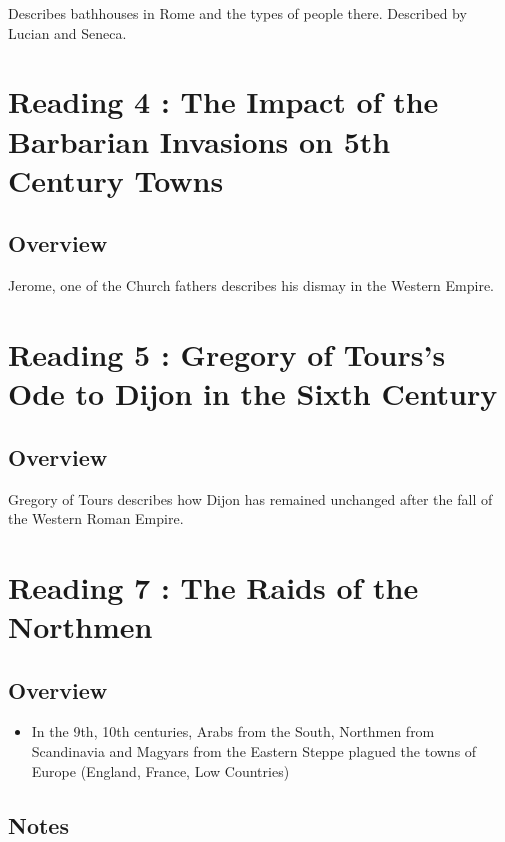 \documentclass[12pt]{article}
\begin{document}
{Describes bathhouses in Rome and the types of people there. Described by Lucian and Seneca.

\section*{Reading 4 : The Impact of the Barbarian Invasions on 5th Century Towns}

\subsection*{Overview}

Jerome, one of the Church fathers describes his dismay in the Western Empire.\\

\section*{Reading 5 : Gregory of Tours's Ode to Dijon in the Sixth Century}

\subsection*{Overview}

Gregory of Tours describes how Dijon has remained unchanged after the fall of the Western Roman Empire.\\

\section*{Reading 7 : The Raids of the Northmen}

\subsection*{Overview}
\begin{itemize}
	\item In the 9th, 10th centuries, Arabs from the South, Northmen from Scandinavia and Magyars from the Eastern Steppe plagued the towns of Europe (England, France, Low Countries)
\end{itemize}

\subsection*{Notes}

}
\end{document}
